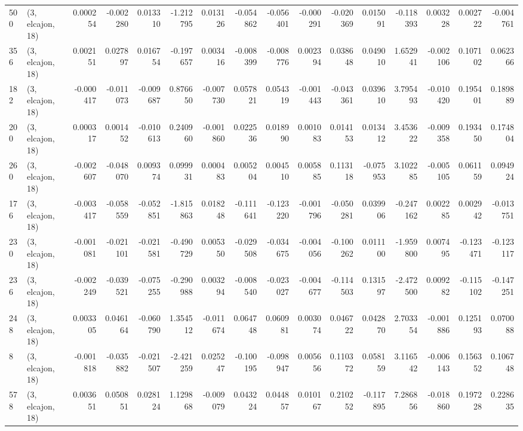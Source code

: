 \begin{tabular}{llrrrrrrrrrrrrrr}
500 &  (3, elcajon, 18) &   0.000254 & -0.002280 &  0.013310 &   -1.212795 &  0.013126 &  -0.054862 & -0.056401 & -0.000291 & -0.020369 &  0.015091 &   -0.118393 &  0.003228 &  0.002722 & -0.004761 \\
356 &  (3, elcajon, 18) &   0.002151 &  0.027897 &  0.016754 &   -0.197657 &  0.003416 &  -0.008399 & -0.008776 &  0.002394 &  0.038648 &  0.049010 &    1.652941 & -0.002106 &  0.107102 &  0.062366 \\
182 &  (3, elcajon, 18) &  -0.000417 & -0.011073 & -0.009687 &    0.876650 & -0.007730 &   0.057821 &  0.054319 & -0.001443 & -0.043361 &  0.039610 &    3.795493 & -0.010420 &  0.195401 &  0.189889 \\
200 &  (3, elcajon, 18) &   0.000317 &  0.001452 & -0.010613 &    0.240960 & -0.001860 &   0.022536 &  0.018990 &  0.001083 &  0.014153 &  0.013412 &    3.453622 & -0.009358 &  0.193450 &  0.174804 \\
260 &  (3, elcajon, 18) &  -0.002607 & -0.048070 &  0.009374 &    0.099931 &  0.000483 &   0.005204 &  0.004510 &  0.005885 &  0.113118 & -0.075953 &    3.102285 & -0.005105 &  0.061159 &  0.094924 \\
176 &  (3, elcajon, 18) &  -0.003417 & -0.058559 & -0.052851 &   -1.815863 &  0.018248 &  -0.111641 & -0.123220 & -0.001796 & -0.050281 &  0.039906 &   -0.247162 &  0.002285 &  0.002942 & -0.013751 \\
230 &  (3, elcajon, 18) &  -0.001081 & -0.021101 & -0.021581 &   -0.490729 &  0.005350 &  -0.029508 & -0.034675 & -0.004056 & -0.100262 &  0.011100 &   -1.959800 &  0.007495 & -0.123471 & -0.123117 \\
236 &  (3, elcajon, 18) &  -0.002249 & -0.039521 & -0.075255 &   -0.290988 &  0.003294 &  -0.008540 & -0.023027 & -0.004677 & -0.114503 &  0.131597 &   -2.472500 &  0.009282 & -0.115102 & -0.147251 \\
248 &  (3, elcajon, 18) &   0.003305 &  0.046164 & -0.060790 &    1.354512 & -0.011674 &   0.064748 &  0.060981 &  0.003074 &  0.046722 &  0.042870 &    2.703354 & -0.001886 &  0.125193 &  0.070088 \\
8   &  (3, elcajon, 18) &  -0.001818 & -0.035882 & -0.021507 &   -2.421259 &  0.025247 &  -0.100195 & -0.098947 &  0.005656 &  0.110372 &  0.058159 &    3.116542 & -0.006143 &  0.156352 &  0.106748 \\
578 &  (3, elcajon, 18) &   0.003651 &  0.050851 &  0.028124 &    1.129868 & -0.009079 &   0.043224 &  0.044857 &  0.010167 &  0.210252 & -0.117895 &    7.286856 & -0.018860 &  0.197228 &  0.228635 \\

\end{tabular}
